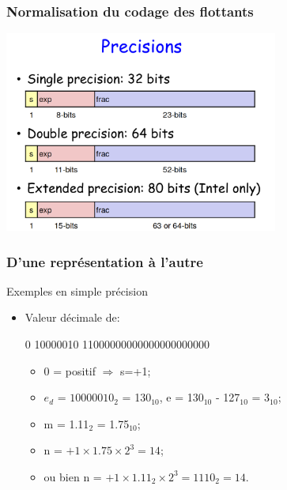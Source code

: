 \documentclass{beamer}
\begin{document}
\begin{frame}
	\frametitle{Normalisation du codage des flottants}
	
	\begin{center}
		\includegraphics[width=9cm]{figs/IEEE_Standards.png}
	\end{center}
	
\end{frame}


\begin{frame}
	\frametitle{D'une représentation à l'autre}
	
	\begin{block}{Exemples en simple précision}
		\begin{itemize}
			\item Valeur décimale de:\\
			\begin{center}
				0 10000010 11000000000000000000000
			\end{center}
			\begin{itemize}
				\item 0 = positif $\Rightarrow$ s=+1;
				\item $e_d$ = $10000010_2$ = 130$_{10}$, e = 130$_{10}$ - 127$_{10}$ =
				$3_{10}$;
				\item m = 1.11$_2$ = 1.75$_{10}$;
				\item n = $+1 \times{}  1.75\times{}2^3=14$;
				\item ou bien n = $+1 \times{} 1.11_2\times{}2^3=1110_2=14$.
			\end{itemize}
		\end{itemize}
	\end{block}
\end{frame}
\end{document}
